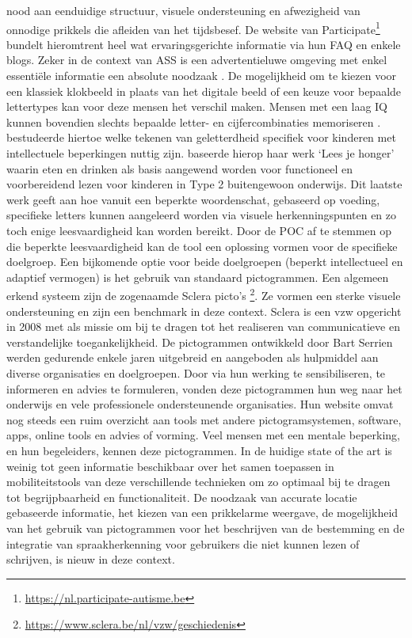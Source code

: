 nood aan eenduidige structuur, visuele ondersteuning en afwezigheid van onnodige prikkels die afleiden van het tijdsbesef. De website van Participate\footnote{\url{https://nl.participate-autisme.be}} bundelt hieromtrent heel wat ervaringsgerichte informatie via hun FAQ en enkele blogs. Zeker in de context van ASS is een advertentieluwe omgeving met enkel essentiële informatie een absolute noodzaak \autocite{Roeyers2014}. De mogelijkheid om te kiezen voor een klassiek klokbeeld in plaats van het digitale beeld of een keuze voor bepaalde lettertypes kan voor deze mensen het verschil maken. Mensen met een laag IQ kunnen bovendien slechts bepaalde letter- en cijfercombinaties memoriseren \autocite{DeGraaf2001, Tytgat2014}. \textcite{Tilborg2018} bestudeerde hiertoe welke tekenen van geletterdheid specifiek voor kinderen met intellectuele beperkingen nuttig zijn. \textcite{Uyttersprot2021} baseerde hierop haar werk ‘Lees je honger’ waarin eten en drinken als basis aangewend worden voor functioneel en voorbereidend lezen voor kinderen in Type 2 buitengewoon onderwijs. Dit laatste werk geeft aan hoe vanuit een beperkte woordenschat, gebaseerd op voeding, specifieke letters kunnen aangeleerd worden via visuele herkenningspunten en zo toch enige leesvaardigheid kan worden bereikt. Door de POC af te stemmen op die beperkte leesvaardigheid kan de tool een oplossing vormen voor de specifieke doelgroep. Een bijkomende optie voor beide doelgroepen (beperkt intellectueel en adaptief vermogen) is het gebruik van standaard pictogrammen. Een algemeen erkend systeem zijn de zogenaamde Sclera picto’s \footnote{\url{https://www.sclera.be/nl/vzw/geschiedenis}}. Ze vormen een sterke visuele ondersteuning en zijn een benchmark in deze context. Sclera is een vzw opgericht in 2008 met als missie om bij te dragen tot het realiseren van communicatieve en verstandelijke toegankelijkheid. De pictogrammen ontwikkeld door Bart Serrien werden gedurende enkele jaren uitgebreid en aangeboden als hulpmiddel aan diverse organisaties en doelgroepen. Door via hun werking te sensibiliseren, te informeren en advies te formuleren, vonden deze pictogrammen hun weg naar het onderwijs en vele professionele ondersteunende organisaties. Hun website omvat nog steeds een ruim overzicht aan tools met andere pictogramsystemen, software, apps, online tools en advies of vorming. Veel mensen met een mentale beperking, en hun begeleiders, kennen deze pictogrammen. In de huidige state of the art is weinig tot geen informatie beschikbaar over het samen toepassen in mobiliteitstools van deze verschillende technieken om zo optimaal bij te dragen tot begrijpbaarheid en functionaliteit. De noodzaak van accurate locatie gebaseerde informatie, het kiezen van een prikkelarme weergave, de mogelijkheid van het gebruik van pictogrammen voor het beschrijven van de bestemming en de integratie van spraakherkenning voor gebruikers die niet kunnen lezen of schrijven, is nieuw in deze context.



